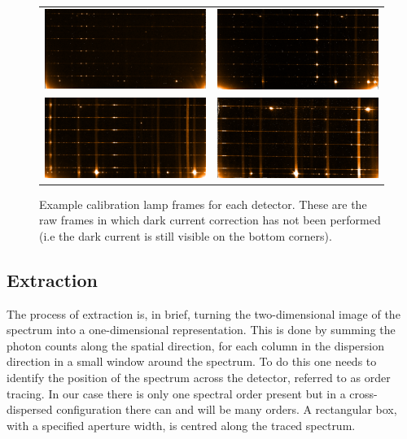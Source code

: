 \begin{figure}
    \begin{tabular}{cc}
         \includegraphics[width=.45\hsize]{./figures/reduction/Thar_1.png} & \includegraphics[width=.45\hsize]{./figures/reduction/Thar_2.png} \\
         \includegraphics[width=.45\hsize]{./figures/reduction/Thar_3.png} & \includegraphics[width=.45\hsize]{./figures/reduction/Thar_4.png} \\
    \end{tabular}

    \caption[Example \thar{} calibration lamp frames for each detector.]{Example \thar{} calibration lamp frames for each detector.
        These are the raw frames in which dark current correction has not been performed (i.e the dark current is still visible on the bottom corners).}
    \label{fig:caliblamps}
\end{figure}


\subsection{Extraction}
\label{subsec:extraction}
The process of extraction is, in brief, turning the two-dimensional image of the spectrum into a one-dimensional representation.
This is done by summing the photon counts along the spatial direction, for each column in the dispersion direction in a small window around the spectrum.
To do this one needs to identify the position of the spectrum across the detector, referred to as {order tracing}.
In our case there is only one spectral order present but in a cross-dispersed configuration there can and will be many orders.
A rectangular box, with a specified aperture width, is centred along the traced spectrum.


